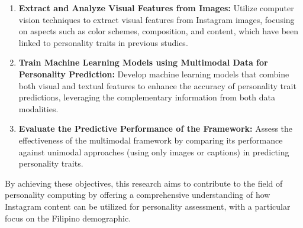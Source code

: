 \begin{enumerate}[label=\textbf{ \arabic*:}, leftmargin=*]
	\item \textbf{Extract and Analyze Visual Features from Images:} Utilize computer vision techniques to extract visual features from Instagram images, focusing on aspects such as color schemes, composition, and content, which have been linked to personality traits in previous studies.
	

	\item \textbf{Train Machine Learning Models using Multimodal Data for Personality Prediction:} Develop machine learning models that combine both visual and textual features to enhance the accuracy of personality trait predictions, leveraging the complementary information from both data modalities.
	
	\item \textbf{Evaluate the Predictive Performance of the Framework:} Assess the effectiveness of the multimodal framework by comparing its performance against unimodal approaches (using only images or captions) in predicting personality traits.
	
\end{enumerate}

By achieving these objectives, this research aims to contribute to the field of personality computing by offering a comprehensive understanding of how Instagram content can be utilized for personality assessment, with a particular focus on the Filipino demographic.





